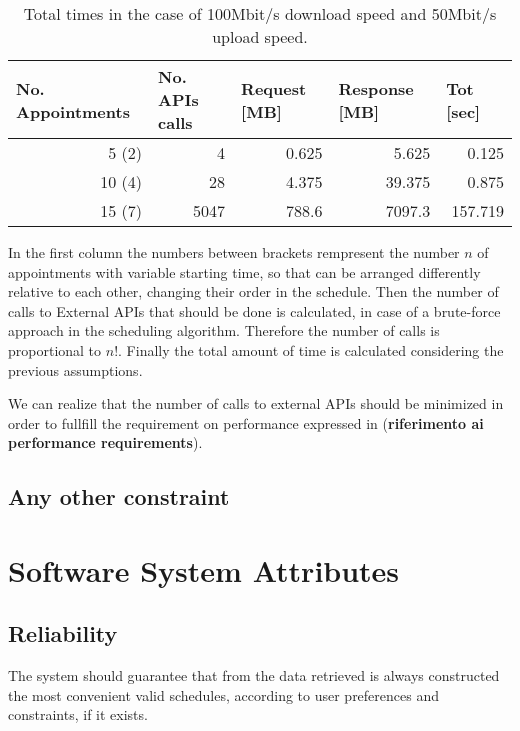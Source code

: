 \begin{table}[htbp]
  \centering
    \begin{tabular}{|r|r|r|r|r|}
    \hline
    \multicolumn{1}{|l|}{\textbf{No. Appointments}} & \multicolumn{1}{l|}{\textbf{No. APIs calls}} & \multicolumn{1}{l|}{\textbf{Request [MB]}} & \multicolumn{1}{l|}{\textbf{Response [MB]}} & \multicolumn{1}{l|}{\textbf{Tot [sec]}} \\ \hline
    5 (2)    & 4   & 0.625 & 5.625 & 0.125 \\ \hline
    10 (4)   & 28 & 4.375 & 39.375 & 0.875 \\ \hline
    15 (7)   & 5047 & 788.6 & 7097.3 & 157.719 \\ \hline
    \end{tabular}%
    \caption{Total times in the case of 100Mbit/s download speed and 50Mbit/s upload speed.}
  \label{tab:addlabel}%
\end{table}%

In the first column the numbers between brackets rempresent the number $n$ of appointments with variable starting time, so that can be arranged differently relative to each other, changing their order in the schedule. Then the number of calls to External APIs that should be done is calculated, in case of a brute-force approach in the scheduling algorithm. Therefore the number of calls is proportional to $n!$.
Finally the total amount of time is calculated considering the previous assumptions.

We can realize that the number of calls to external APIs should be minimized in order to fullfill the requirement on performance expressed in (\textbf{riferimento ai performance requirements}).

\subsection{Any other constraint}


\section{Software System Attributes}

\subsection{Reliability}
The system should guarantee that from the data retrieved is always constructed the most convenient valid schedules, according to user preferences and constraints, if it exists.


